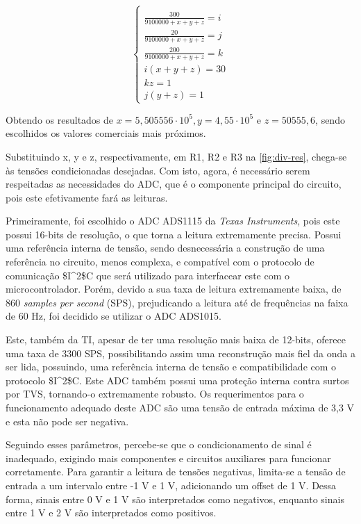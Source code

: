 \begin{equation}
    \label{eq01}
    \left\{\begin{matrix}
        \\ \frac{300}{9100000+x+y+z} = i
        \\ \frac{20}{9100000+x+y+z} = j
        \\ \frac{200}{9100000+x+y+z} = k
        \\ i (x+y+z) = 30
        \\ kz = 1
        \\ j(y+z) = 1
    \end{matrix}\right.
\end{equation}

Obtendo os resultados de $x = 5,505556 \cdot 10^{5}, y = 4,55 \cdot 10^{5}$ e $z = 50555,6$, sendo escolhidos os valores comerciais mais próximos.

Substituindo x, y e z, respectivamente, em R1, R2 e R3 na \autoref{fig:div-res}, chega-se às tensões condicionadas desejadas. Com isto, agora, é necessário serem respeitadas as necessidades do \gls{ADC}, que é o componente principal do circuito, pois este efetivamente fará as leituras.

Primeiramente, foi escolhido o \gls{ADC} ADS1115 da \textit{Texas Instruments}, pois este possui 16-bits de resolução, o que torna a leitura extremamente precisa. Possui uma referência interna de tensão, sendo desnecessária a construção de uma referência no circuito, menos complexa, e compatível com o protocolo de comunicação \gls{$I^2$C} que será utilizado para interfacear este com o microcontrolador. Porém, devido a sua taxa de leitura extremamente baixa, de 860 \textit{samples per second} (\gls{SPS}), prejudicando a leitura até de frequências na faixa de 60 Hz, foi decidido se utilizar o \gls{ADC} ADS1015.

Este, também da \gls{TI}, apesar de ter uma resolução mais baixa de 12-bits, oferece uma taxa de 3300 \gls{SPS}, possibilitando assim uma reconstrução mais fiel da onda a ser lida, possuindo, uma referência interna de tensão e compatibilidade com o protocolo \gls{$I^2$C}. Este \gls{ADC} também possui uma proteção interna contra surtos por \gls{TVS}, tornando-o extremamente robusto. Os requerimentos para o funcionamento adequado deste \gls{ADC} são uma tensão de entrada máxima de 3,3 V e esta não pode ser negativa.

Seguindo esses parâmetros, percebe-se que o condicionamento de sinal é inadequado, exigindo mais componentes e circuitos auxiliares para funcionar corretamente. Para garantir a leitura de tensões negativas, limita-se a tensão de entrada a um intervalo entre -1 V e 1 V, adicionando um offset de 1 V. Dessa forma, sinais entre 0 V e 1 V são interpretados como negativos, enquanto sinais entre 1 V e 2 V são interpretados como positivos.

